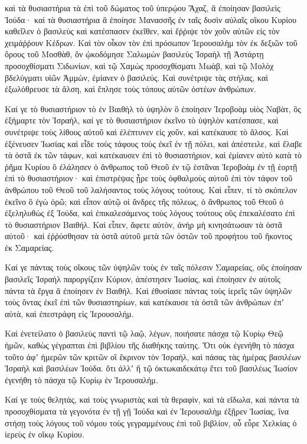 {καὶ τὰ θυσιαστήρια τὰ ἐπὶ τοῦ δώματος τοῦ ὑπερῴου Ἄχαζ, ἃ ἐποίησαν βασιλεὶς Ἰούδα· καὶ τὰ θυσιαστήρια ἃ ἐποίησε Μανασσῆς ἐν ταῖς δυσὶν αὐλαῖς οἴκου Κυρίου καθεῖλεν ὁ βασιλεὺς καὶ κατέσπασεν ἐκεῖθεν, καὶ ἔῤῥιψε τὸν χοῦν αὐτῶν εἰς τὸν χειμάῤῥουν Κέδρων.
Καὶ τὸν οἶκον τὸν ἐπὶ πρόσωπον Ἱερουσαλὴμ τὸν ἐκ δεξιῶν τοῦ ὄρους τοῦ Μοσθὰθ, ὃν ᾠκοδόμησε Σαλωμὼν βασιλεὺς Ἰσραὴλ τῇ Ἀστάρτῃ προσοχθίσματι Σιδωνίων, καὶ τῷ Χαμὼς προσοχθίσματι Μωὰβ, καὶ τῷ Μολὸχ βδελύγματι υἱῶν Ἀμμὼν, ἐμίανεν ὁ βασιλεύς.
Καὶ συνέτριψε τὰς στήλας, καὶ ἐξωλόθρευσε τὰ ἄλση, καὶ ἔπλησε τοὺς τόπους αὐτῶν ὀστέων ἀνθρώπων.
\par }{\PP {}Καί γε τὸ θυσιαστήριον τὸ ἐν Βαιθὴλ τὸ ὑψηλὸν ὃ ἐποίησεν Ἱεροβοὰμ υἱὸς Ναβὰτ, ὃς ἐξήμαρτε τὸν Ἰσραὴλ, καί γε τὸ θυσιαστήριον ἐκεῖνο τὸ ὑψηλὸν κατέσπασε, καὶ συνέτριψε τοὺς λίθους αὐτοῦ καὶ ἐλέπτυνεν εἰς χοῦν, καὶ κατέκαυσε τὸ ἄλσος.
Καὶ ἐξένευσεν Ἰωσίας καὶ εἶδε τοὺς τάφους τοὺς ἐκεῖ ἐν τῇ πόλει, καὶ ἀπέστειλε, καὶ ἔλαβε τὰ ὀστᾶ ἐκ τῶν τάφων, καὶ κατέκαυσεν ἐπὶ τὸ θυσιαστήριον, καὶ ἐμίανεν αὐτὸ κατὰ τὸ ῥῆμα Κυρίου ὃ ἐλάλησεν ὁ ἄνθρωπος τοῦ Θεοῦ ἐν τῷ ἑστᾶναι Ἱεροβοὰμ ἐν τῇ ἑορτῇ ἐπὶ τὸ θυσιαστήριον· καὶ ἐπιστρέψας ᾖρε τοὺς ὀφθαλμοὺς αὐτοῦ ἐπὶ τὸν τάφον τοῦ ἀνθρώπου τοῦ Θεοῦ τοῦ λαλήσαντος τοὺς λόγους τούτους.
Καὶ εἶπεν, τί τὸ σκόπελον ἐκεῖνο ὃ ἐγὼ ὁρῶ; καὶ εἶπον αὐτῷ οἱ ἄνδρες τῆς πόλεως, ὁ ἄνθρωπος τοῦ Θεοῦ ὁ ἐξεληλυθὼς ἐξ Ἰούδα, καὶ ἐπικαλεσάμενος τοὺς λόγους τούτους οὓς ἐπεκαλέσατο ἐπὶ τὸ θυσιαστήριον Βαιθήλ.
Καὶ εἶπεν, ἄφετε αὐτὸν, ἀνὴρ μὴ κινησάτωσαν τὰ ὀστᾶ αὐτοῦ· καὶ ἐῤῥύσθησαν τὰ ὀστᾶ αὐτοῦ μετὰ τῶν ὀστῶν τοῦ προφήτου τοῦ ἥκοντος ἐκ Σαμαρείας.
\par }{\PP {}Καί γε πάντας τοὺς οἴκους τῶν ὑψηλῶν τοὺς ἐν ταῖς πόλεσιν Σαμαρείας, οὓς ἐποίησαν βασιλεῖς Ἰσραὴλ παροργίζειν Κύριον, ἀπέστησεν Ἰωσίας, καὶ ἐποίησεν ἐν αὐτοῖς πάντα τὰ ἔργα ἃ ἐποίησεν ἐν Βαιθήλ.
Καὶ ἐθυσίασε πάντας τοὺς ἱερεῖς τῶν ὑψηλῶν τοὺς ὄντας ἐκεῖ ἐπὶ τῶν θυσιαστηρίων, καὶ κατέκαυσε τὰ ὀστᾶ τῶν ἀνθρώπων ἐπʼ αὐτὰ, καὶ ἐπεστράφη εἰς Ἱερουσαλήμ.
\par }{\PP {}Καὶ ἐνετείλατο ὁ βασιλεὺς παντὶ τῷ λαῷ, λέγων, ποιήσατε πάσχα τῷ Κυρίῳ Θεῷ ἡμῶν, καθὼς γέγραπται ἐπὶ βιβλίου τῆς διαθήκης ταύτης.
Ὅτι οὐκ ἐγενήθη τὸ πάσχα τοῦτο ἀφʼ ἡμερῶν τῶν κριτῶν οἳ ἔκρινον τὸν Ἰσραὴλ, καὶ πάσας τὰς ἡμέρας βασιλέων Ἰσραὴλ καὶ βασιλέων Ἰούδα.
ὅτι ἀλλʼ ἢ τῷ ὀκτωκαιδεκάτῳ ἔτει τοῦ βασιλέως Ἰωσίον ἐγενήθη τὸ πάσχα τῷ Κυρίῳ ἐν Ἰερουσαλήμ.
\par }{\PP {}Καί γε τοὺς θελητὰς, καὶ τοὺς γνωριστὰς καὶ τὰ θεραφὶν, καὶ τὰ εἴδωλα, καὶ πάντα τὰ προσοχθίσματα τὰ γεγονότα ἐν τῇ γῇ Ἰούδα καὶ ἐν Ἱερουσαλὴμ ἐξῇρεν Ἰωσίας, ἵνα στήσῃ τοὺς λόγους τοῦ νόμου τοὺς γεγραμμένους ἐπὶ τοῦ βιβλίον, οὗ εὗρε Χελκίας ὁ ἱερεὺς ἐν οἴκῳ Κυρίου.
}
